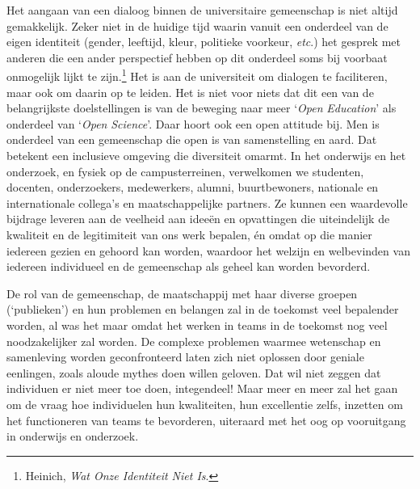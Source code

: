 \documentclass[smallauthor, chapterhaspagenum, nochapterinheader, pagenuminheader,  bigchapnum,medium2, tocpages, garamond, titleinheader]{jote-book}
\begin{document}
	Het aangaan van een dialoog binnen de universitaire gemeenschap is niet altijd gemakkelijk. Zeker niet in de huidige tijd waarin vanuit een onderdeel van de eigen identiteit (gender, leeftijd, kleur, politieke voorkeur, \emph{etc}.) het gesprek met anderen die een ander perspectief hebben op dit onderdeel soms bij voorbaat onmogelijk lijkt te zijn.\footnote{Heinich, \emph{Wat Onze Identiteit Niet Is}.} Het is aan de universiteit om dialogen te faciliteren, maar ook om daarin op te leiden. Het is niet voor niets dat dit een van de belangrijkste doelstellingen is van de beweging naar meer ‘\emph{Open }\emph{Education}' als onderdeel van ‘\emph{Open }\emph{Science}'. Daar hoort ook een open attitude bij. Men is onderdeel van een gemeenschap die open is van samenstelling en aard. Dat betekent een inclusieve omgeving die diversiteit omarmt. In het onderwijs en het onderzoek, en fysiek op de campusterreinen, verwelkomen we studenten, docenten, onderzoekers, medewerkers, alumni, buurtbewoners, nationale en internationale collega's en maatschappelijke partners. Ze kunnen een waardevolle bijdrage leveren aan de veelheid aan ideeën en opvattingen die uiteindelijk de kwaliteit en de legitimiteit van ons werk bepalen, én omdat op die manier iedereen gezien en gehoord kan worden, waardoor het welzijn en welbevinden van iedereen individueel en de gemeenschap als geheel kan worden bevorderd.



	De rol van de gemeenschap, de maatschappij met haar diverse groepen (‘publieken') en hun problemen en belangen zal in de toekomst veel bepalender worden, al was het maar omdat het werken in teams in de toekomst nog veel noodzakelijker zal worden. De complexe problemen waarmee wetenschap en samenleving worden geconfronteerd laten zich niet oplossen door geniale eenlingen, zoals aloude mythes doen willen geloven. Dat wil niet zeggen dat individuen er niet meer toe doen, integendeel! Maar meer en meer zal het gaan om de vraag hoe individuelen hun kwaliteiten, hun excellentie zelfs, inzetten om het functioneren van teams te bevorderen, uiteraard met het oog op vooruitgang in onderwijs en onderzoek.
\end{document}
